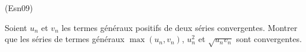 \begin{tiny}(Esn09)\end{tiny} Soient $u_n$ et $v_n$ les termes généraux positifs de deux séries convergentes. Montrer que les séries de termes généraux $\max(u_n,v_n)$, $u_n^2$ et $\sqrt{u_n v_n}$ sont convergentes.